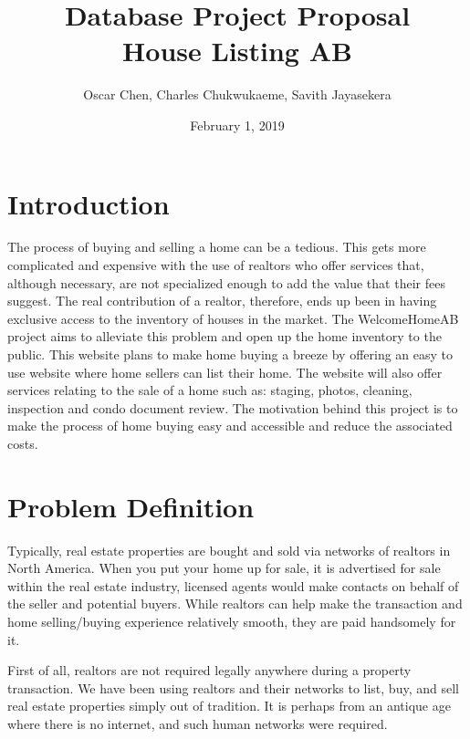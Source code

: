\documentclass[letterpaper,12pt]{article}
\begin{document}
\title{\Large{\textbf{Database Project Proposal \\ House Listing AB}}}
\author{Oscar Chen, Charles Chukwukaeme, Savith Jayasekera}
\date{February 1, 2019}
\setlength{\droptitle}{-2.5cm}
\maketitle


\section{Introduction}

The process of buying and selling a home can be a tedious. This gets more complicated and expensive with the use of realtors who offer services that, although necessary, are not specialized enough to add the value that their fees suggest. The real contribution of a realtor, therefore, ends up been in having exclusive access to the inventory of houses in the market. 
The WelcomeHomeAB project aims to alleviate this problem and open up the home inventory to the public. This website plans to make home buying a breeze by offering an easy to use website where home sellers can list their home. The website will also offer services relating to the sale of a home such as: staging, photos, cleaning, inspection and condo document review.
The motivation behind this project is to make the process of home buying easy and accessible and reduce the associated costs.


\section{Problem Definition}

Typically, real estate properties are bought and sold via networks of realtors in North America. When you put your home up for sale, it is advertised for sale within the real estate industry, licensed agents would make contacts on behalf of the seller and potential buyers. While realtors can help make the transaction and home selling/buying experience relatively smooth, they are paid handsomely for it. 


First of all, realtors are not required legally anywhere during a property transaction. We have been using realtors and their networks to list, buy, and sell real estate properties simply out of tradition. It is perhaps from an antique age where there is no internet, and such human networks were required.
\end{document}
